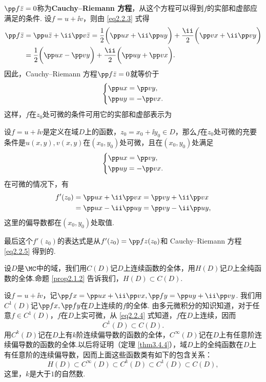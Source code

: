 $\pp f{\bar z}=0$称为\textbf{Cauchy--Riemann 方程}，从这个方程可以得到$f$的实部和虚部应满足的条件. 设$f=u+\ii v$，则由 \eqref{eq2.2.3} 式得
\begin{align*}
  \pp f{\bar z} & = \pp u{\bar z} + \ii\pp v{\bar z} = \frac12\bigg(\pp ux + \ii \pp uy\bigg)
  + \frac{\ii}2\bigg(\pp vx + \ii\pp vy\bigg)\\
  & = \frac12\bigg( \pp ux - \pp vy \bigg) + \frac{\ii}2\bigg(\pp uy + \pp vx\bigg).
\end{align*}
因此，Cauchy--Riemann 方程$\pp f{\bar z}=0$就等价于
\begin{equation}\label{eq2.2.5}
  \left\{\begin{aligned}
          & \pp ux = \pp vy,\\
          & \pp uy = -\pp vx.
         \end{aligned}
  \right.
\end{equation}
这样，$f$在$z_0$处可微的条件可用它的实部和虚部表示为
\begin{theorem}\label{thm2.2.4}
  设$f=u+\ii v$是定义在域$D$上的函数，$z_0=x_0+\ii y_0\in D$，那么$f$在$z_0$处可微的充要条件是$u(x,y),v(x,y)$在$(x_0,y_0)$处可微，且在$(x_0,y_0)$处满足
  \begin{equation*}
    \left\{\begin{aligned}
          & \pp ux = \pp vy,\\
          & \pp uy = -\pp vx.
           \end{aligned}
    \right.
  \end{equation*}
  在可微的情况下，有
  \begin{align*}
    f'(z_0) & = \pp ux + \ii \pp vx = \pp vy + \ii \pp vx\\
    & = \pp ux-\ii\pp uy=\pp vy-\ii \pp uy,
  \end{align*}
  这里的偏导数都在$(x_0,y_0)$处取值.
\end{theorem}

最后这个$f'(z_0)$的表达式是从$f'(z_0)=\pp fz(z_0)$和 Cauchy--Riemann 方程 \eqref{eq2.2.5} 得到的.

设$D$是$\MC$中的域，我们用$C(D)$记$D$上连续函数的全体，用$H(D)$记$D$上全纯函数的全体.命题 \ref{prop2.1.2} 告诉我们，$H(D)\subset C(D)$.

设$f=u+\ii v$，记$\pp fx=\pp ux+\ii\pp vx,\pp fy=\pp uy+\ii\pp vy$. 我们用$C^1(D)$记$\pp fx,\pp fy$在$D$上连续的$f$的全体. 由多元微积分的知识知道，对于任意$f\in C^1(D)$，$f$在$D$上实可微，从 \eqref{eq2.2.4} 式知道，$f$在$D$上连续，因而
\[
  C^1(D) \subset C(D).
\]
用$C^k(D)$记在$D$上有$k$阶连续偏导数的函数的全体，$C^\infty(D)$记在$D$上有任意阶连续偏导数的函数的全体.以后将证明（定理 \ref{thm3.4.4}），域$D$上的全纯函数在$D$上有任意阶的连续偏导数，因而上面这些函数类有如下的包含关系：
\[H(D)\subset C^\infty(D)\subset C^k(D)\subset C^1(D)\subset C(D),\]
这里，$k$是大于$1$的自然数.

